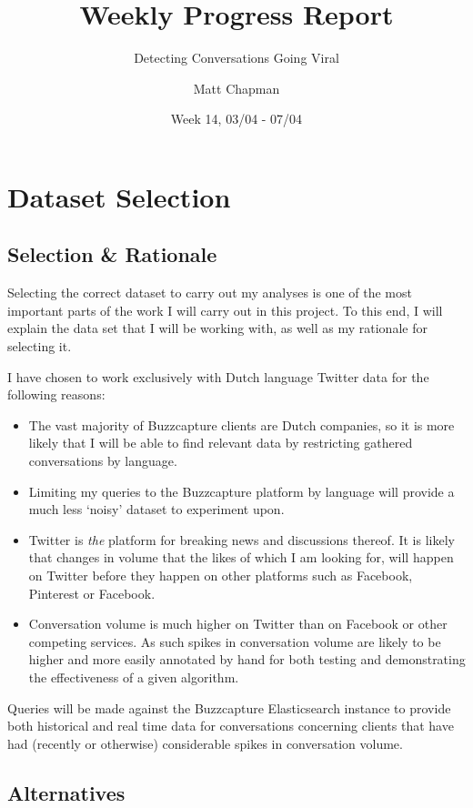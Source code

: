 \documentclass{mattreport}
\title{Weekly Progress Report}
\subtitle{Detecting Conversations Going Viral}
\date{Week 14, 03/04 - 07/04}
\author{Matt Chapman}
\begin{document}
\maketitle

\section{Dataset Selection}

\subsection{Selection \& Rationale}

Selecting the correct dataset to carry out my analyses is one of the most important parts of the work I will carry out in this project. To this end, I will explain the data set that I will be working with, as well as my rationale for selecting it.

I have chosen to work exclusively with Dutch language Twitter data for the following reasons:

\begin{itemize}
	\item The vast majority of Buzzcapture clients are Dutch companies, so it is more likely that I will be able to find relevant data by restricting gathered conversations by language.
	\item Limiting my queries to the Buzzcapture platform by language will provide a much less `noisy' dataset to experiment upon.
	\item Twitter is \emph{the} platform for breaking news and discussions thereof. It is likely that changes in volume that the likes of which I am looking for, will happen on Twitter before they happen on other platforms such as Facebook, Pinterest or Facebook.
	\item Conversation volume is much higher on Twitter than on Facebook or other competing services. As such spikes in conversation volume are likely to be higher and more easily annotated by hand for both testing and demonstrating the effectiveness of a given algorithm.
\end{itemize}

Queries will be made against the Buzzcapture Elasticsearch instance to provide both historical and real time data for conversations concerning clients that have had (recently or otherwise) considerable spikes in conversation volume.

\subsection{Alternatives}
\end{document}
